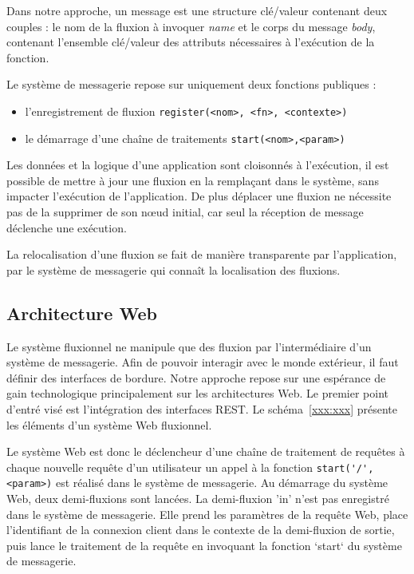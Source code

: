 Dans notre approche, un message est une structure clé/valeur
contenant deux couples : le nom de la fluxion à invoquer \textit{name} et le
corps du message \textit{body}, contenant l'ensemble clé/valeur des
attributs nécessaires à l'exécution de la fonction. 

Le système de messagerie repose sur uniquement deux fonctions publiques :
\begin{itemize}
  \item l'enregistrement de fluxion
    \texttt{register(<nom>, <fn>, <contexte>)}
  \item le démarrage d'une chaîne de traitements
    \texttt{start(<nom>,<param>)}
\end{itemize}

Les données et la logique d'une application sont cloisonnés
à l'exécution, il est possible de mettre à jour une
fluxion en la remplaçant dans le système, sans impacter l'exécution de
l'application. De plus déplacer une fluxion ne nécessite pas de la
supprimer de son n\oe ud initial, car seul la réception de message
déclenche une exécution. 

La relocalisation d'une fluxion se fait de manière transparente
par l'application, par le système de messagerie qui connaît la
localisation des fluxions. 

\subsection{Architecture Web}

Le système fluxionnel ne manipule que des fluxion par l'intermédiaire d'un
système de messagerie. Afin de pouvoir interagir avec le monde extérieur,
il faut définir des interfaces de bordure. Notre approche repose sur une
espérance de gain technologique principalement sur les architectures Web.
Le premier point d'entré visé est l'intégration des interfaces REST.  Le
schéma~\ref{xxx:xxx} présente les éléments d'un système Web fluxionnel.


Le système Web est donc le déclencheur d'une chaîne de traitement de
requêtes à chaque nouvelle requête d'un utilisateur un appel à la fonction
\lstinline|start('/', <param>)| est réalisé dans le système de messagerie.
Au démarrage du système Web, deux demi-fluxions sont lancées.  La
demi-fluxion 'in' n'est pas enregistré dans le système de messagerie.
Elle prend les paramètres de la requête Web, place l'identifiant de la
connexion client dans le contexte de la demi-fluxion de sortie, puis lance
le traitement de la requête en invoquant la fonction `start` du système de
messagerie.

